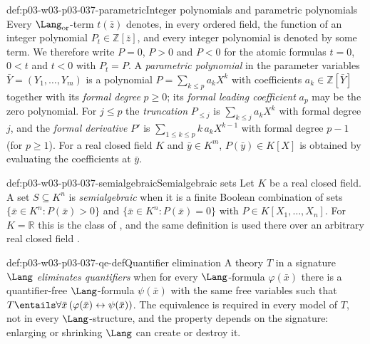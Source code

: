 \begin{hbconvention}{def:p03-w03-p03-037-parametric}{Integer polynomials and parametric polynomials}
Every \(\Lang_{\mathrm{or}}\)-term \(t(\bar z)\) denotes, in every ordered
field, the function of an integer polynomial \(P_t\in\mathbb Z[\bar z]\), and
every integer polynomial is denoted by some term.  We therefore write
\(P=0\), \(P>0\) and \(P<0\) for the atomic formulas \(t=0\), \(0<t\) and
\(t<0\) with \(P_t=P\).  A \emph{parametric polynomial} in the parameter
variables \(\bar Y=(Y_1,\dots,Y_m)\) is a polynomial
\(P=\sum_{k\leq p}a_kX^k\) with coefficients \(a_k\in\mathbb Z[\bar Y]\)
together with its \emph{formal degree} \(p\geq0\); its \emph{formal leading
coefficient} \(a_p\) may be the zero polynomial.  For \(j\leq p\) the
\emph{truncation} \(P_{\leq j}\) is \(\sum_{k\leq j}a_kX^k\) with formal
degree \(j\), and the \emph{formal derivative} \(P'\) is
\(\sum_{1\leq k\leq p}k\,a_kX^{k-1}\) with formal degree \(p-1\) (for
\(p\geq1\)).  For a real closed field \(K\) and \(\bar y\in K^m\),
\(P(\bar y)\in K[X]\) is obtained by evaluating the coefficients at
\(\bar y\).
\end{hbconvention}

\begin{hbdefinition}{def:p03-w03-p03-037-semialgebraic}{Semialgebraic sets}
Let \(K\) be a real closed field.  A set \(S\subseteq K^n\) is
\emph{semialgebraic} when it is a finite Boolean combination of sets
\(\{\bar x\in K^n:P(\bar x)>0\}\) and \(\{\bar x\in K^n:P(\bar x)=0\}\) with
\(P\in K[X_1,\dots,X_n]\).  For \(K=\mathbb R\) this is the class of
\cite[p.~5]{Coste1999OMin}, and the same definition is used there over an
arbitrary real closed field \cite[p.~9]{Coste1999OMin}.
\end{hbdefinition}

\begin{hbdefinition}{def:p03-w03-p03-037-qe-def}{Quantifier elimination}
A theory \(T\) in a signature \(\Lang\) \emph{eliminates quantifiers} when
for every \(\Lang\)-formula \(\varphi(\bar x)\) there is a quantifier-free
\(\Lang\)-formula \(\psi(\bar x)\) with the same free variables such that
\(T\entails\forall\bar x\,(\varphi(\bar x)\leftrightarrow\psi(\bar x))\).
The equivalence is required in every model of \(T\), not in every
\(\Lang\)-structure, and the property depends on the signature: enlarging
or shrinking \(\Lang\) can create or destroy it.
\end{hbdefinition}

